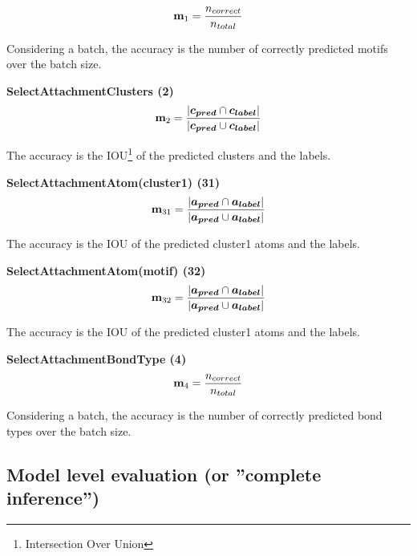\documentclass{article}
\begin{document}
\begin{description}

\item[\textbf{SelectMotifMlp (1)}]
\begin{equation}
    \mathbf{m}_1 = \frac{n_{correct}}{n_{total}}
\end{equation}

Considering a batch, the accuracy is the number of correctly predicted motifs over the batch size.

\item{\textbf{SelectAttachmentClusters (2)}}
\begin{equation}
    \mathbf{m}_2 =
    \frac{|\boldsymbol{c_{pred}} \cap \boldsymbol{c_{label}}|}
    {|\boldsymbol{c_{pred}} \cup \boldsymbol{c_{label}}|}
\end{equation}

The accuracy is the IOU\footnote{Intersection Over Union} of the predicted clusters and the labels.

\item{\textbf{SelectAttachmentAtom(cluster1) (31)}}
\begin{equation}
    \mathbf{m}_{31} =
    \frac{|\boldsymbol{a_{pred}} \cap \boldsymbol{a_{label}}|}
    {|\boldsymbol{a_{pred}} \cup \boldsymbol{a_{label}}|}
\end{equation}

The accuracy is the IOU of the predicted cluster1 atoms and the labels.

\item{\textbf{SelectAttachmentAtom(motif) (32)}}
\begin{equation}
    \mathbf{m}_{32} =
    \frac{|\boldsymbol{a_{pred}} \cap \boldsymbol{a_{label}}|}
    {|\boldsymbol{a_{pred}} \cup \boldsymbol{a_{label}}|}
\end{equation}

The accuracy is the IOU of the predicted cluster1 atoms and the labels.

\item{\textbf{SelectAttachmentBondType (4)}}
\begin{equation}
    \mathbf{m}_4 = \frac{n_{correct}}{n_{total}}
\end{equation}

Considering a batch, the accuracy is the number of correctly predicted bond types over the batch size.

\end{description}

\subsection{Model level evaluation (or ''complete inference'')}
\end{document}
